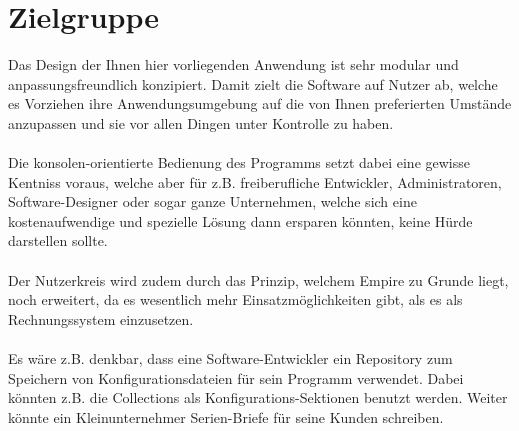 
\section{Zielgruppe}

Das Design der Ihnen hier vorliegenden Anwendung ist sehr modular und anpassungsfreundlich konzipiert. Damit zielt die Software auf Nutzer ab, welche
es Vorziehen ihre Anwendungsumgebung auf die von Ihnen preferierten Umstände anzupassen und sie vor allen Dingen unter Kontrolle zu haben.
\\\\
Die konsolen-orientierte Bedienung des Programms setzt dabei eine gewisse Kentniss voraus, welche aber für z.B. freiberufliche Entwickler, Administratoren,
Software-Designer oder sogar ganze Unternehmen, welche sich eine kostenaufwendige und spezielle Lösung dann ersparen könnten, keine Hürde darstellen sollte.
\\\\
Der Nutzerkreis wird zudem durch das Prinzip, welchem Empire zu Grunde liegt, noch erweitert, da es wesentlich mehr Einsatzmöglichkeiten gibt, als es als Rechnungssystem
einzusetzen.
\\\\
Es wäre z.B. denkbar, dass eine Software-Entwickler ein Repository zum Speichern von Konfigurationsdateien für sein Programm verwendet.
Dabei könnten z.B. die Collections als Konfigurations-Sektionen benutzt werden. Weiter könnte ein Kleinunternehmer Serien-Briefe für seine Kunden schreiben.

%
%
